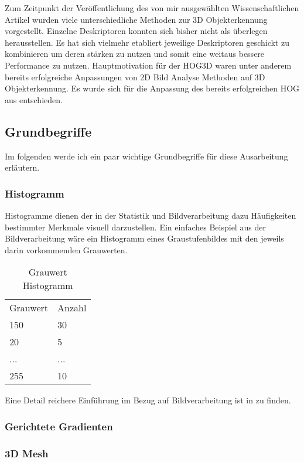Zum Zeitpunkt der Veröffentlichung des von mir ausgewählten Wissenschaftlichen Artikel wurden viele
unterschiedliche Methoden zur 3D Objekterkennung vorgestellt. Einzelne Deskriptoren konnten sich 
bisher nicht als überlegen herausstellen. Es hat sich vielmehr etabliert jeweilige Deskriptoren
geschickt zu kombinieren um deren stärken zu nutzen und somit eine weitaus bessere Performance zu nutzen.
\newline
Hauptmotivation für der HOG3D waren unter anderem bereits erfolgreiche Anpassungen von 2D Bild Analyse Methoden auf 3D Objekterkennung. Es wurde sich für die Anpassung des bereits erfolgreichen HOG aus \cite{dalal2005histograms} entschieden.

\subsection{Grundbegriffe}
Im folgenden werde ich ein paar wichtige Grundbegriffe für diese Ausarbeitung erläutern. 

\subsubsection{Histogramm}
Histogramme dienen der in der Statistik und Bildverarbeitung dazu Häufigkeiten bestimmter Merkmale
visuell darzustellen. Ein einfaches Beispiel aus der Bildverarbeitung wäre ein Histogramm eines
Graustufenbildes mit den jeweils darin vorkommenden Grauwerten. 

\begin{table}[H]
	\centering
	\caption{Grauwert Histogramm}
	\label{bsp Histogramm}
	\begin{tabular}{ll}
		Grauwert & Anzahl \\
		150      & 30     \\
		20       & 5      \\
		...      & ...    \\
		255      & 10    
	\end{tabular}
\end{table}

Eine Detail reichere Einführung im Bezug auf Bildverarbeitung ist in \cite{Priese15} zu finden.

\subsubsection{Gerichtete Gradienten}


\subsubsection{3D Mesh}
